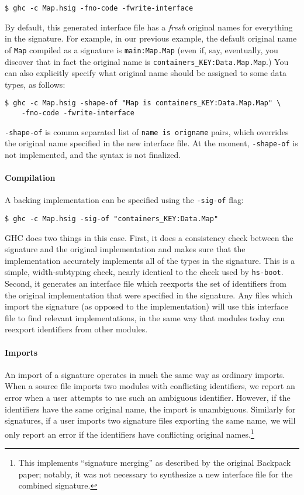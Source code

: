 \documentclass{article}
\newcommand{\Red}[1]{{\color{red} #1}}
\begin{document}
\begin{verbatim}
$ ghc -c Map.hsig -fno-code -fwrite-interface
\end{verbatim}

By default, this generated interface file has a \emph{fresh} original
names for everything in the signature. For example, in our
previous example, the default original name of \texttt{Map} compiled as
a signature is \texttt{main:Map.Map} (even if, say, eventually, you
discover that in fact the original name is
\texttt{containers\_KEY:Data.Map.Map}.)  You can also explicitly specify what
original name should be assigned to some data types, as follows:

\begin{verbatim}
$ ghc -c Map.hsig -shape-of "Map is containers_KEY:Data.Map.Map" \
    -fno-code -fwrite-interface
\end{verbatim}

\texttt{-shape-of} is comma separated list of \texttt{name is origname}
pairs, which overrides the original name specified in the new interface
file.  \Red{At the moment, \texttt{-shape-of} is not implemented, and the syntax
is not finalized.}


\paragraph{Compilation}  A backing implementation can be specified
using the \texttt{-sig-of} flag:

\begin{verbatim}
$ ghc -c Map.hsig -sig-of "containers_KEY:Data.Map"
\end{verbatim}

GHC does two things in this case.  First, it does a consistency check
between the signature and the original implementation and makes sure
that the implementation accurately implements all of the types in the
signature.  This is a simple, width-subtyping check, nearly identical to
the check used by \texttt{hs-boot}.  Second, it generates an interface
file which reexports the set of identifiers from the original
implementation that were specified in the signature.  Any files which
import the signature (as opposed to the implementation) will use this
interface file to find relevant implementations, in the same way that
modules today can reexport identifiers from other modules.

\paragraph{Imports} An import of a signature operates in much the same
way as ordinary imports.  When a source file imports two modules with
conflicting identifiers, we report an error when a user attempts to use
such an ambiguous identifier.  However, if the identifiers have the same
original name, the import is unambiguous.  Similarly for signatures, if
a user imports two signature files exporting the same name, we will only
report an error if the identifiers have conflicting original names.\footnote{This implements ``signature merging'' as described by the original Backpack paper; notably, it was not necessary to synthesize a new interface file for the combined signature.}
\end{document}

